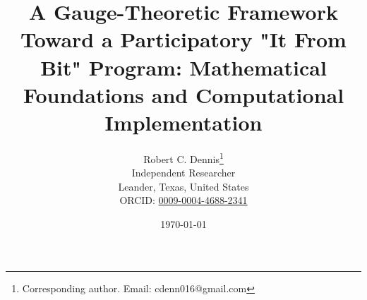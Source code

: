 \documentclass[11pt]{article}
\begin{document}
\title{A Gauge-Theoretic Framework Toward a Participatory "It From Bit" Program: Mathematical Foundations and Computational Implementation}

\author{
  Robert C. Dennis\thanks{Corresponding author. Email: cdenn016@gmail.com}\\[0.3cm]
  \small Independent Researcher\\
  \small Leander, Texas, United States\\[0.2cm]
  \small ORCID: \href{https://orcid.org/0009-0004-4688-2341}{0009-0004-4688-2341} %
}

\date{\today}

\maketitle
\end{document}
